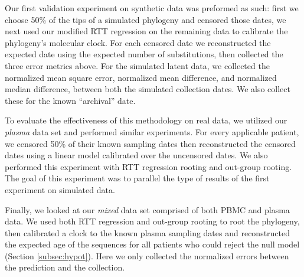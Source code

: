 Our first validation experiment on synthetic data was preformed as such: first we choose 50\% of the tips of a simulated phylogeny and censored those dates, we next used our  modified RTT regression \citep{APE} on the remaining data to calibrate the phylogeny's molecular clock. 
For each censored date we reconstructed the expected date using the expected number of substitutions, then collected the three error metrics above.
For the simulated latent data, we collected the normalized mean square error, normalized mean difference, and normalized median difference, between both the simulated collection dates. We also collect these for the known ``archival'' date.

To evaluate the effectiveness of this methodology on real data, we utilized our {\em plasma} data set \citep{McCloskey14} and performed similar experiments. 
For every applicable patient, we censored 50\% of their known sampling dates then reconstructed the censored dates using a linear model calibrated over the uncensored dates. 
We also performed this experiment with RTT regression rooting and out-group rooting. The goal of this experiment was to parallel the type of results of the first experiment on simulated data. 

Finally, we looked at our {\em mixed} data set comprised of both PBMC and plasma data. 
We used both RTT regression and out-group rooting to root the phylogeny, then calibrated a clock to the known plasma sampling dates and reconstructed the expected age of the sequences for all patients who could reject the null model (Section \ref{subsec:hypot}). 
Here we only collected the normalized errors between the prediction and the collection.


